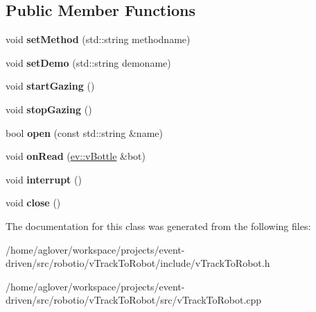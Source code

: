 \subsection*{Public Member Functions}
\begin{DoxyCompactItemize}
\item 
void {\bfseries set\+Method} (std\+::string methodname)\hypertarget{classvTrackToRobotManager_ada1644880b4c6f127e79a440bf5ed9f3}{}\label{classvTrackToRobotManager_ada1644880b4c6f127e79a440bf5ed9f3}

\item 
void {\bfseries set\+Demo} (std\+::string demoname)\hypertarget{classvTrackToRobotManager_ae30c22fd31a7c8bcef72aec0462db7fa}{}\label{classvTrackToRobotManager_ae30c22fd31a7c8bcef72aec0462db7fa}

\item 
void {\bfseries start\+Gazing} ()\hypertarget{classvTrackToRobotManager_a5989c99917c5dba694b2eeae5dcc4af8}{}\label{classvTrackToRobotManager_a5989c99917c5dba694b2eeae5dcc4af8}

\item 
void {\bfseries stop\+Gazing} ()\hypertarget{classvTrackToRobotManager_abb4dd1f6e4965be867aabeccc8674056}{}\label{classvTrackToRobotManager_abb4dd1f6e4965be867aabeccc8674056}

\item 
bool {\bfseries open} (const std\+::string \&name)\hypertarget{classvTrackToRobotManager_acd829a9e8130d24812666a2738926468}{}\label{classvTrackToRobotManager_acd829a9e8130d24812666a2738926468}

\item 
void {\bfseries on\+Read} (\hyperlink{classev_1_1vBottle}{ev\+::v\+Bottle} \&bot)\hypertarget{classvTrackToRobotManager_a8ba3d4d747e4691bf3dc8724aa69569c}{}\label{classvTrackToRobotManager_a8ba3d4d747e4691bf3dc8724aa69569c}

\item 
void {\bfseries interrupt} ()\hypertarget{classvTrackToRobotManager_a3d413d0808aeef12be32541cd2e892ed}{}\label{classvTrackToRobotManager_a3d413d0808aeef12be32541cd2e892ed}

\item 
void {\bfseries close} ()\hypertarget{classvTrackToRobotManager_a2d43766cdec75aa97d064276c17ee81c}{}\label{classvTrackToRobotManager_a2d43766cdec75aa97d064276c17ee81c}

\end{DoxyCompactItemize}


The documentation for this class was generated from the following files\+:\begin{DoxyCompactItemize}
\item 
/home/aglover/workspace/projects/event-\/driven/src/robotio/v\+Track\+To\+Robot/include/v\+Track\+To\+Robot.\+h\item 
/home/aglover/workspace/projects/event-\/driven/src/robotio/v\+Track\+To\+Robot/src/v\+Track\+To\+Robot.\+cpp\end{DoxyCompactItemize}
